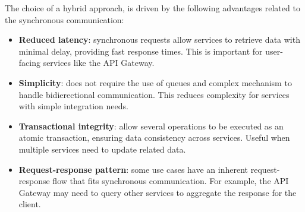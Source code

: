 \begin{itemize}
    The choice of a hybrid approach, is driven by the following advantages related to the synchronous communication:
    \begin{itemize}
        \item \textbf{Reduced latency}: synchronous requests allow services to retrieve data with minimal delay, providing fast response times. This is important for user-facing services like the API Gateway.
        \item \textbf{Simplicity}: does not require the use of queues and complex mechanism to handle bidierectional communication. This reduces complexity for services with simple integration needs.
        \item \textbf{Transactional integrity}:  allow several operations to be executed as an atomic transaction, ensuring data consistency across services. Useful when multiple services need to update related data.
        \item \textbf{Request-response pattern}: some use cases have an inherent request-response flow that fits synchronous communication. For example, the API Gateway may need to query other services to aggregate the response for the client.
    \end{itemize}

\end{itemize}
